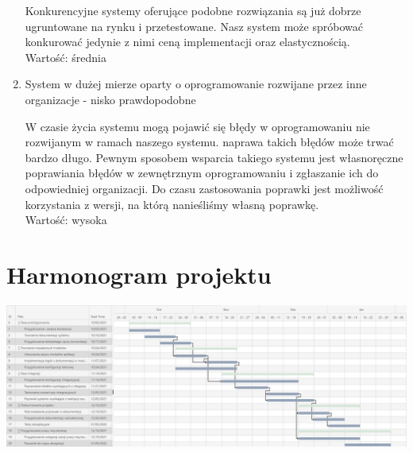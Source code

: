 \documentclass[12pt]{article}
\begin{document}
\begin{enumerate}
		Konkurencyjne systemy oferujące podobne rozwiązania są już dobrze ugruntowane na rynku i przetestowane. Nasz system może spróbować konkurować jedynie z nimi ceną implementacji oraz elastycznością.\\
		Wartość: średnia
	\item System w dużej mierze oparty o oprogramowanie rozwijane przez inne organizacje - nisko prawdopodobne
	
		W czasie życia systemu mogą pojawić się błędy w oprogramowaniu nie rozwijanym w ramach naszego systemu. naprawa takich błędów może trwać bardzo długo. Pewnym sposobem wsparcia takiego systemu jest własnoręczne poprawiania błędów w zewnętrznym oprogramowaniu i zgłaszanie ich do odpowiedniej organizacji. Do czasu zastosowania poprawki jest możliwość korzystania z wersji, na którą nanieśliśmy własną poprawkę.\\
		Wartość: wysoka
		
\end{enumerate}

\section{Harmonogram projektu}
\includegraphics[width=\textwidth]{resources/harmonogram.png}
\end{document}
